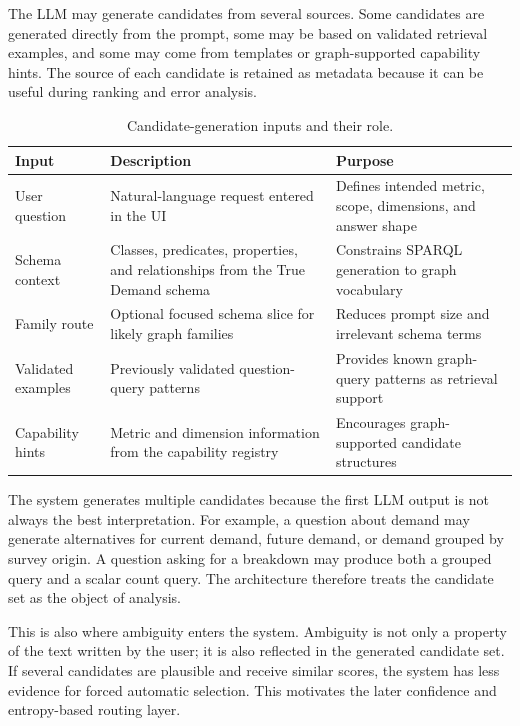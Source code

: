 The LLM may generate candidates from several sources. Some candidates are generated directly from the prompt, some may be based on validated retrieval examples, and some may come from templates or graph-supported capability hints. The source of each candidate is retained as metadata because it can be useful during ranking and error analysis.

\begin{table}[ht]
\centering
\caption{Candidate-generation inputs and their role.}
\label{tab:candidate-generation-inputs}
\begin{tabular}{p{3.8cm}p{6.0cm}p{4.0cm}}
\hline
\textbf{Input} & \textbf{Description} & \textbf{Purpose} \\
\hline
User question & Natural-language request entered in the UI & Defines intended metric, scope, dimensions, and answer shape \\
Schema context & Classes, predicates, properties, and relationships from the True Demand schema & Constrains SPARQL generation to graph vocabulary \\
Family route & Optional focused schema slice for likely graph families & Reduces prompt size and irrelevant schema terms \\
Validated examples & Previously validated question-query patterns & Provides known graph-query patterns as retrieval support \\
Capability hints & Metric and dimension information from the capability registry & Encourages graph-supported candidate structures \\
\hline
\end{tabular}
\end{table}

The system generates multiple candidates because the first LLM output is not always the best interpretation. For example, a question about demand may generate alternatives for current demand, future demand, or demand grouped by survey origin. A question asking for a breakdown may produce both a grouped query and a scalar count query. The architecture therefore treats the candidate set as the object of analysis.

This is also where ambiguity enters the system. Ambiguity is not only a property of the text written by the user; it is also reflected in the generated candidate set. If several candidates are plausible and receive similar scores, the system has less evidence for forced automatic selection. This motivates the later confidence and entropy-based routing layer.

